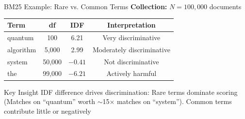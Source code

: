 \documentclass[aspectratio=169]{beamer}
\begin{document}
\begin{frame}{BM25 Example: Rare vs. Common Terms}
\textbf{Collection:} $N = 100{,}000$ documents

\vspace{1em}

\begin{table}
\centering
\begin{tabular}{lccc}
\toprule
\textbf{Term} & \textbf{df} & \textbf{IDF} & \textbf{Interpretation} \\
\midrule
quantum & 100 & 6.21 & Very discriminative \\
algorithm & 5{,}000 & 2.99 & Moderately discriminative \\
system & 50{,}000 & $-0.41$ & Not discriminative \\
the & 99{,}000 & $-6.21$ & Actively harmful \\
\bottomrule
\end{tabular}
\end{table}

\vspace{1em}

\begin{block}{Key Insight}
IDF difference drives discrimination: Rare terms dominate scoring (Matches on ``quantum'' worth $\sim$15$\times$ matches on ``system''). Common terms contribute little or negatively


\end{block}
\end{frame}





\end{document}
